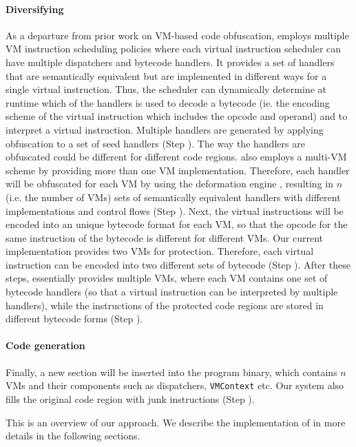 \paragraph*{Diversifying}
As a departure from prior work on VM-based code obfuscation, \DSVMP employs multiple VM instruction scheduling policies
where each virtual instruction scheduler can have multiple dispatchers and bytecode handlers. It provides a set of handlers
that are semantically equivalent but  are implemented in different ways for a single virtual instruction.
Thus, the scheduler can dynamically determine at runtime which of the handlers is used to decode a bytecode (ie. the encoding
scheme of the virtual instruction which includes the opcode and operand) and to interpret a virtual instruction.
Multiple handlers are generated by applying obfuscation to a set of seed handlers (Step ).
The way the handlers are obfuscated could be different for different code regions.
\DSVMP also employs a multi-VM scheme by providing more than one VM implementation.
Therefore, each handler will be obfuscated for each VM by using the deformation engine , resulting in $n$ (i.e. the number of VMs) sets of semantically equivalent handlers with different implementations and control flows (Step ).
Next, the virtual instructions will be encoded into an unique bytecode format for each VM, so that the opcode for the same instruction of the bytecode is
different for different VMs. 
Our current implementation provides two VMs for protection. Therefore, each 
virtual instruction can be encoded into two different sets of bytecode (Step ). 
After these steps, \DSVMP essentially provides multiple VMs, where each VM contains one set of bytecode handlers (so that a virtual instruction
can be interpreted by multiple handlers), while the instructions of the protected code regions are stored in different bytecode forms (Step ).

\paragraph*{Code generation}
Finally, a new section will be inserted into the program binary, which contains $n$ VMs and their components such as dispatchers, \texttt{VMContext} etc. Our system also fills the original code region with junk instructions (Step ).

This is an overview of our approach. We describe the implementation of \DSVMP in more details in the following sections.
